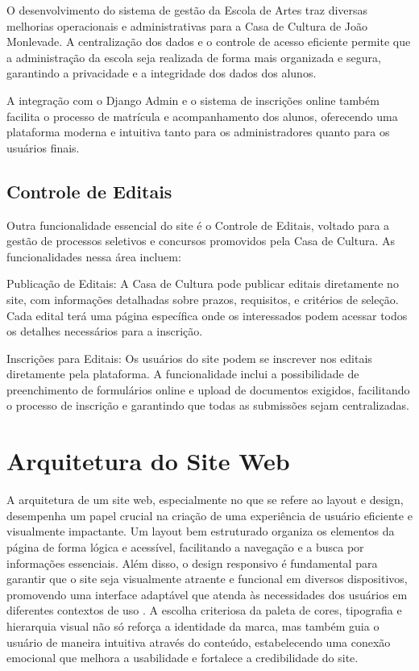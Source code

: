 O desenvolvimento do sistema de gestão da Escola de Artes traz diversas melhorias operacionais e administrativas para a Casa de Cultura de João Monlevade. A centralização dos dados e o controle de acesso eficiente permite que a administração da escola seja realizada de forma mais organizada e segura, garantindo a privacidade e a integridade dos dados dos alunos.

A integração com o Django Admin e o sistema de inscrições online também facilita o processo de matrícula e acompanhamento dos alunos, oferecendo uma plataforma moderna e intuitiva tanto para os administradores quanto para os usuários finais.

\subsection{Controle de Editais}

Outra funcionalidade essencial do site é o Controle de Editais, voltado para a gestão de processos seletivos e concursos promovidos pela Casa de Cultura. As funcionalidades nessa área incluem:

Publicação de Editais: A Casa de Cultura pode publicar editais diretamente no site, com informações detalhadas sobre prazos, requisitos, e critérios de seleção. Cada edital terá uma página específica onde os interessados podem acessar todos os detalhes necessários para a inscrição.

Inscrições para Editais: Os usuários do site podem se inscrever nos editais diretamente pela plataforma. A funcionalidade inclui a possibilidade de preenchimento de formulários online e upload de documentos exigidos, facilitando o processo de inscrição e garantindo que todas as submissões sejam centralizadas.

\section{Arquitetura do Site Web}

A arquitetura de um site web, especialmente no que se refere ao layout e design, desempenha um papel crucial na criação de uma experiência de usuário eficiente e visualmente impactante. Um layout bem estruturado organiza os elementos da página de forma lógica e acessível, facilitando a navegação e a busca por informações essenciais. Além disso, o design responsivo é fundamental para garantir que o site seja visualmente atraente e funcional em diversos dispositivos, promovendo uma interface adaptável que atenda às necessidades dos usuários em diferentes contextos de uso \cite{garrett2010elements}. A escolha criteriosa da paleta de cores, tipografia e hierarquia visual não só reforça a identidade da marca, mas também guia o usuário de maneira intuitiva através do conteúdo, estabelecendo uma conexão emocional que melhora a usabilidade e fortalece a credibilidade do site.

